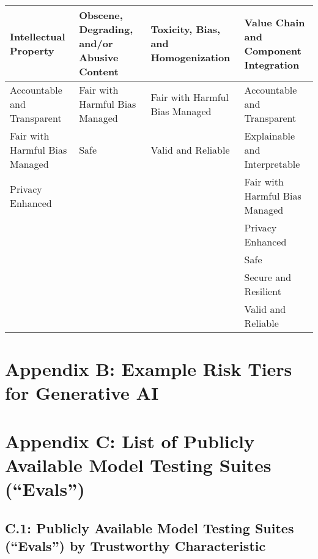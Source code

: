 \documentclass[fleqn]{article}
\begin{document}
\begin{landscape}
\begin{table}[H]
\begin{tabular}{llll}
		\toprule
		Intellectual Property & Obscene, Degrading, and/or Abusive Content & Toxicity, Bias, and Homogenization & Value Chain and Component Integration \\
		\midrule
		Accountable and Transparent & Fair with Harmful Bias Managed & Fair with Harmful Bias Managed & Accountable and Transparent \\
		Fair with Harmful Bias Managed & Safe & Valid and Reliable & Explainable and Interpretable \\
		Privacy Enhanced &  &  & Fair with Harmful Bias Managed \\
 		&  &  & Privacy Enhanced \\
 		&  &  & Safe \\
 		&  &  & Secure and Resilient \\
 		&  &  & Valid and Reliable \\
		\bottomrule
	\end{tabular}
\end{table}
\vfill
\raisebox{-10pt}{\makebox[\linewidth]{\thepage}}
\end{landscape}

\section*{Appendix B: Example Risk Tiers for Generative AI}\label{sec:appndxb}

\section*{Appendix C: List of Publicly Available Model Testing Suites (``Evals'')}\label{sec:appndxc}



\subsection*{C.1: Publicly Available Model Testing Suites (``Evals'') by Trustworthy Characteristic}\label{appndxc1}
\end{document}

